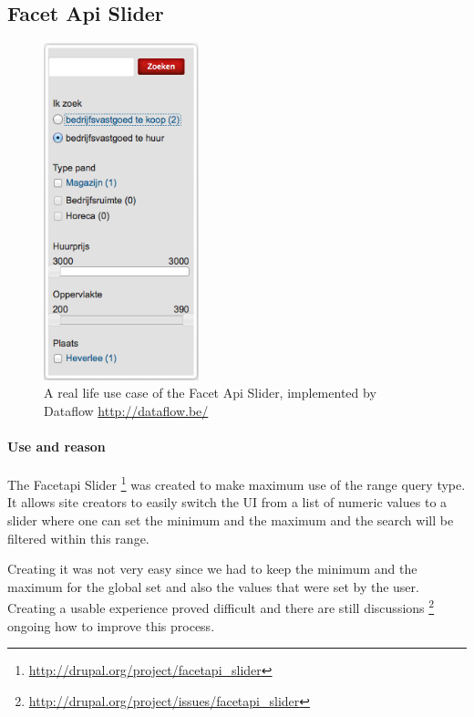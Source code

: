 \subsection{Facet Api Slider}
\begin{figure}
\begin{center}
     \includegraphics[width=0.4\textwidth]{images/implementation/facetapi_dataflow.png}
     \caption{A real life use case of the Facet Api Slider, implemented by Dataflow \url{http://dataflow.be/}}
\end{center}
\end{figure}
\paragraph{Use and reason}
The Facetapi Slider \footnote{\url{http://drupal.org/project/facetapi_slider}} was created to make maximum use of the range query type. It allows site creators to easily switch the UI from a list of numeric values to a slider where one can set the minimum and the maximum and the search will be filtered within this range. 

Creating it was not very easy since we had to keep the minimum and the maximum for the global set and also the values that were set by the user. Creating a usable experience proved difficult and there are still discussions \footnote{\url{http://drupal.org/project/issues/facetapi_slider}} ongoing how to improve this process. 

